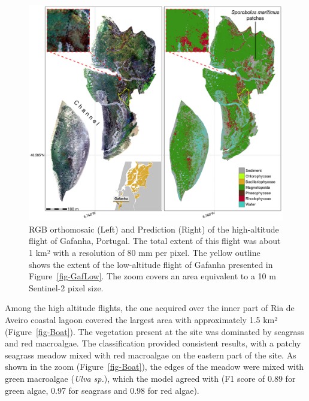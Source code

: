 \documentclass[
  letterpaper,
  11pt,
  english,
  singlespacing,
  headsepline]{MastersDoctoralThesis}
\begin{document}
\begin{spacing}{1.5}
\begin{figure}
{\includegraphics[width=0.95\linewidth,height=\textheight,keepaspectratio]{Chapter3/Figs/Figure6.png}

}

\caption{\label{fig-GafHigh}RGB orthomosaic (Left) and Prediction
(Right) of the high-altitude flight of Gafanha, Portugal. The total
extent of this flight was about 1 km² with a resolution of 80 mm per
pixel. The yellow outline shows the extent of the low-altitude flight of
Gafanha presented in Figure~\ref{fig-GafLow}. The zoom covers an area
equivalent to a 10 m Sentinel-2 pixel size.}

\end{figure}%

Among the high altitude flights, the one acquired over the inner part of
Ria de Aveiro coastal lagoon covered the largest area with approximately
1.5 km² (Figure~\ref{fig-Boat}). The vegetation present at the site was
dominated by seagrass and red macroalgae. The classification provided
consistent results, with a patchy seagrass meadow mixed with red
macroalgae on the eastern part of the site. As shown in the zoom
(Figure~\ref{fig-Boat}), the edges of the meadow were mixed with green
macroalgae (\emph{Ulva sp.}), which the model agreed with (F1 score of
0.89 for green algae, 0.97 for seagrass and 0.98 for red algae).

\begin{figure}

\centering{

}
\end{figure}
\end{spacing}
\end{document}
